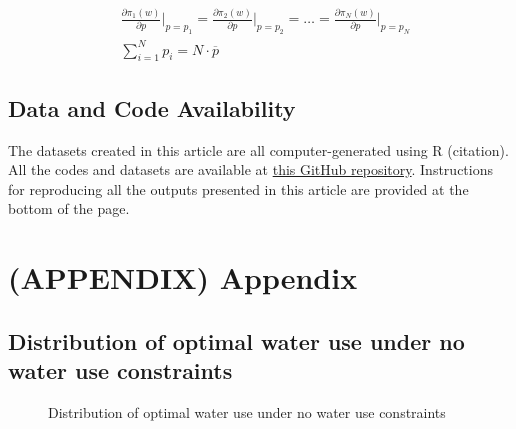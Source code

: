\documentclass[
  letterpaper,
  DIV=11,
  numbers=noendperiod]{scrartcl}
\begin{document}
\begin{align}
& \frac{\partial \pi_1(w)}{\partial p}\Big\rvert_{p = p_1} = \frac{\partial \pi_2(w)}{\partial p}\Big\rvert_{p = p_2} = \dots = \frac{\partial \pi_N(w)}{\partial p}\Big\rvert_{p = p_N} \\
& \sum_{i=1}^N p_i = N \cdot \overline{p}
\end{align}

\subsection{Data and Code
Availability}\label{data-and-code-availability}

The datasets created in this article are all computer-generated using R
(citation). All the codes and datasets are available at
\href{https://github.com/tmieno2/Measurement-Error-Water-Management}{this
GitHub repository}. Instructions for reproducing all the outputs
presented in this article are provided at the bottom of the page.

\section*{(APPENDIX) Appendix}\label{appendix-appendix}

\subsection{Distribution of optimal water use under no water use
constraints}\label{distribution-of-optimal-water-use-under-no-water-use-constraints}

\begin{figure}[H]


\caption{\label{fig-dist-opt-w}Distribution of optimal water use under
no water use constraints}

\end{figure}%
\end{document}
